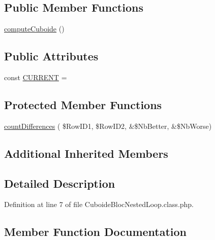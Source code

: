 \subsection*{Public Member Functions}
\begin{DoxyCompactItemize}
\item 
\hyperlink{class_cuboide_bloc_nested_loop_acee44f594a7c62bf10098f7e488ee7a4}{compute\+Cuboide} ()
\end{DoxyCompactItemize}
\subsection*{Public Attributes}
\begin{DoxyCompactItemize}
\item 
const \hyperlink{class_cuboide_bloc_nested_loop_a94f99752da9420a212a93c6dc2cedfee}{C\+U\+R\+R\+E\+NT} = \textquotesingle{}\textquotesingle{}
\end{DoxyCompactItemize}
\subsection*{Protected Member Functions}
\begin{DoxyCompactItemize}
\item 
\hyperlink{class_cuboide_bloc_nested_loop_ac403846d4983ce29b9d3a8f3f8cb2e5f}{count\+Differences} ( \$Row\+I\+D1, \$Row\+I\+D2, \&\$Nb\+Better, \&\$Nb\+Worse)
\end{DoxyCompactItemize}
\subsection*{Additional Inherited Members}


\subsection{Detailed Description}


Definition at line 7 of file Cuboide\+Bloc\+Nested\+Loop.\+class.\+php.



\subsection{Member Function Documentation}
\mbox{\label{class_cuboide_bloc_nested_loop_acee44f594a7c62bf10098f7e488ee7a4}} 
